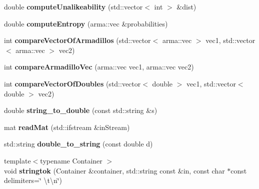 \begin{DoxyCompactItemize}
\item 
double {\bfseries compute\+Unalikeability} (std\+::vector$<$ int $>$ \&dist)\hypertarget{namespacekukadu_a9b2794fd699515b27827d17e72170b8c}{}\label{namespacekukadu_a9b2794fd699515b27827d17e72170b8c}

\item 
double {\bfseries compute\+Entropy} (arma\+::vec \&probabilities)\hypertarget{namespacekukadu_a30afa6b6881b3e3d55e27e26013c14f8}{}\label{namespacekukadu_a30afa6b6881b3e3d55e27e26013c14f8}

\item 
int {\bfseries compare\+Vector\+Of\+Armadillos} (std\+::vector$<$ arma\+::vec $>$ vec1, std\+::vector$<$ arma\+::vec $>$ vec2)\hypertarget{namespacekukadu_a432d51adba03ad970dc0a3d07bbff718}{}\label{namespacekukadu_a432d51adba03ad970dc0a3d07bbff718}

\item 
int {\bfseries compare\+Armadillo\+Vec} (arma\+::vec vec1, arma\+::vec vec2)\hypertarget{namespacekukadu_ac23d451b73ca627a0b9798b8f940ba22}{}\label{namespacekukadu_ac23d451b73ca627a0b9798b8f940ba22}

\item 
int {\bfseries compare\+Vector\+Of\+Doubles} (std\+::vector$<$ double $>$ vec1, std\+::vector$<$ double $>$ vec2)\hypertarget{namespacekukadu_a20bd3cddb2a809db91032ee08336f7c1}{}\label{namespacekukadu_a20bd3cddb2a809db91032ee08336f7c1}

\item 
double {\bfseries string\+\_\+to\+\_\+double} (const std\+::string \&s)\hypertarget{namespacekukadu_a98d5b3b19d52db3ae4d0ec86544828c3}{}\label{namespacekukadu_a98d5b3b19d52db3ae4d0ec86544828c3}

\item 
mat {\bfseries read\+Mat} (std\+::ifstream \&in\+Stream)\hypertarget{namespacekukadu_a098f6e18074cc91c0ce93dfa8b3c214c}{}\label{namespacekukadu_a098f6e18074cc91c0ce93dfa8b3c214c}

\item 
std\+::string {\bfseries double\+\_\+to\+\_\+string} (const double d)\hypertarget{namespacekukadu_a96a0b0e4ddea21ce59c048facc488565}{}\label{namespacekukadu_a96a0b0e4ddea21ce59c048facc488565}

\item 
{\footnotesize template$<$typename Container $>$ }\\void {\bfseries stringtok} (Container \&container, std\+::string const \&in, const char $\ast$const delimiters=\char`\"{} \textbackslash{}t\textbackslash{}n\char`\"{})\hypertarget{namespacekukadu_adc0c3a0b9a1affd427c8585758459256}{}\label{namespacekukadu_adc0c3a0b9a1affd427c8585758459256}


\end{DoxyCompactItemize}
